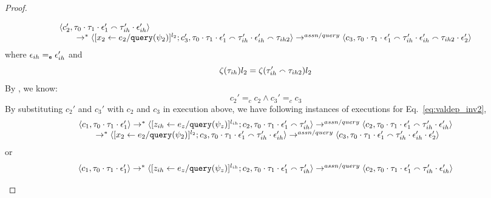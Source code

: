 \begin{proof}
\begin{case}
\begin{subcase}
\begin{subsubcase}
\begin{subsubsubcase}
\begin{equation}
\begin{array}{l}
  \langle {c}_2',  \mathtt{\tau}_0 \cdot \mathtt{\tau}_1 \cdot \mathtt{\epsilon}_1'  \smallfrown \mathtt{\tau}_{ih}' \cdot \mathtt{\epsilon}_{ih}' \rangle  \\
  \qquad \rightarrow^{*} 
  \langle [\mathrel{ {x}_2 \leftarrow e_2 / {\tt query}(\psi_2) }]^{l_2};{c}_3', 
  \mathtt{\tau}_0 \cdot \mathtt{\tau}_1 \cdot \mathtt{\epsilon}_1'  \smallfrown \mathtt{\tau}_{ih}' \cdot \mathtt{\epsilon}_{ih}' \smallfrown \mathtt{\tau}_{ih2} \rangle 
  \rightarrow^{assn/query} 
  \langle {c}_3,  \mathtt{\tau}_0 \cdot \mathtt{\tau}_1 \cdot \mathtt{\epsilon}_1'  \smallfrown \mathtt{\tau}_{ih}' \cdot \mathtt{\epsilon}_{ih}' \smallfrown \mathtt{\tau}_{ih2} \cdot \mathtt{\epsilon}_2' \rangle 
\end{array}
 \end{equation}
 where $\mathtt{\epsilon}_{ih} =_{\mathtt{e}} \mathtt{\epsilon}_{ih}'$ and
 \[
 \mathtt{\zeta}(\mathtt{\tau}_{ih}) l_2 = \mathtt{\zeta}(\mathtt{\tau}_{ih}'\smallfrown \mathtt{\tau}_{ih2}) l_2
 \]
 By , we know:
 \[
 c_2' =_c c_2 \land c_3' =_c c_3
 \]
By substituting $c_2'$ and $c_3'$ with $c_2$ and $c_3$ in execution above, 
we have following instances of executions for Eq.~\ref{eq:valdep_inv2}, 
%
\begin{equation}
\label{eq:m1asn_inv2}
  \begin{array}{l}   
  \langle c_1, \mathtt{\tau}_0 \cdot \mathtt{\tau}_1 \cdot \mathtt{\epsilon}_1' \rangle 
  \rightarrow^{*} 
  \langle [\mathrel{ z_{ih} \leftarrow e_z / {\tt query}(\psi_z) }]^{l_{ih}};{c}_2, 
  \mathtt{\tau}_0 \cdot \mathtt{\tau}_1 \cdot \mathtt{\epsilon}_1' \smallfrown \mathtt{\tau}_{ih}' \rangle 
  \rightarrow^{assn/query} 
  \langle {c}_2,  \mathtt{\tau}_0 \cdot \mathtt{\tau}_1 \cdot \mathtt{\epsilon}_1'  \smallfrown \mathtt{\tau}_{ih}' \cdot \mathtt{\epsilon}_{ih}' \rangle  \\
  \qquad \rightarrow^{*} 
  \langle [\mathrel{ {x}_2 \leftarrow e_2 / {\tt query}(\psi_2) }]^{l_2};{c}_3, 
  \mathtt{\tau}_0 \cdot \mathtt{\tau}_1 \cdot \mathtt{\epsilon}_1'  \smallfrown \mathtt{\tau}_{ih}' \cdot \mathtt{\epsilon}_{ih}' \rangle 
  \rightarrow^{assn/query} 
  \langle {c}_3,  \mathtt{\tau}_0 \cdot \mathtt{\tau}_1 \cdot \mathtt{\epsilon}_1'  \smallfrown \mathtt{\tau}_{ih}' \cdot \mathtt{\epsilon}_{ih}' \cdot \mathtt{\epsilon}_2' \rangle 
\end{array}
 \end{equation}
 or 
\[
  \begin{array}{l}   
  \langle c_1, \mathtt{\tau}_0 \cdot \mathtt{\tau}_1 \cdot \mathtt{\epsilon}_1' \rangle 
  \rightarrow^{*} 
  \langle [\mathrel{ z_{ih} \leftarrow e_z / {\tt query}(\psi_z) }]^{l_{ih}};{c}_2, 
  \mathtt{\tau}_0 \cdot \mathtt{\tau}_1 \cdot \mathtt{\epsilon}_1' \smallfrown \mathtt{\tau}_{ih}' \rangle 
  \rightarrow^{assn/query} 
  \langle {c}_2,  \mathtt{\tau}_0 \cdot \mathtt{\tau}_1 \cdot \mathtt{\epsilon}_1'  \smallfrown \mathtt{\tau}_{ih}' \cdot \mathtt{\epsilon}_{ih}' \rangle  \\

\end{array}\]
\end{subsubsubcase}
\end{subsubcase}
\end{subcase}
\end{case}
\end{proof}
